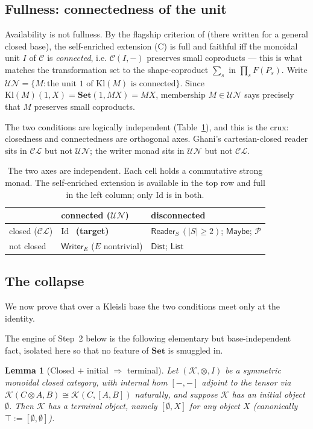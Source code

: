 \documentclass[11pt]{amsart}
\theoremstyle{plain}
\newtheorem{lemma}[theorem]{Lemma}
\theoremstyle{definition}
\theoremstyle{remark}
\newcommand{\Set}{\mathbf{Set}}
\newcommand{\Kl}{\mathrm{Kl}}
\newcommand{\Id}{\mathrm{Id}}
\newcommand{\Writer}{\mathsf{Writer}}
\newcommand{\Maybe}{\mathsf{Maybe}}
\newcommand{\Reader}{\mathsf{Reader}}
\newcommand{\Dist}{\mathsf{Dist}}
\newcommand{\List}{\mathsf{List}}
\newcommand{\PP}{\mathcal{P}}
\newcommand{\C}{\mathcal{C}}
\newcommand{\CL}{\mathcal{CL}}
\newcommand{\UN}{\mathcal{UN}}
\begin{document}
\subsection{Fullness: connectedness of the unit}\label{ssec:un}
Availability is not fullness. By the flagship criterion of \cite{MacBethBase} (there written for a
general closed base), the self-enriched extension (C) is full and faithful iff the monoidal unit $I$
of $\C$ is \emph{connected}, i.e. $\C(I,-)$ preserves small coproducts --- this is what matches the
transformation set to the shape-coproduct $\sum_s$ in $\prod_s F(P_s)$. Write
$\UN=\{M: \text{the unit }1\text{ of }\Kl(M)\text{ is connected}\}$. Since $\Kl(M)(1,X)=\Set(1,MX)=MX$,
membership $M\in\UN$ says precisely that $M$ preserves small coproducts.

The two conditions are logically independent (Table~\ref{tab:2x2}), and this is the crux: closedness
and connectedness are orthogonal axes. Ghani's cartesian-closed reader sits in $\CL$ but not $\UN$;
the writer monad sits in $\UN$ but not $\CL$.

\begin{table}[t]
\small
\begin{tabular}{@{}lll@{}}
\toprule
 & connected ($\UN$) & disconnected \\
\midrule
closed ($\CL$) & $\Id$ \ \textbf{(target)} & $\Reader_S\,(|S|\ge2)$; $\Maybe$; $\PP$ \\
not closed & $\Writer_E$ ($E$ nontrivial) & $\Dist$; $\List$ \\
\bottomrule
\end{tabular}
\medskip
\caption{The two axes are independent. Each cell holds a commutative strong monad. The self-enriched
extension is available in the top row and full in the left column; only $\Id$ is in both.}
\label{tab:2x2}
\end{table}

\subsection{The collapse}\label{ssec:collapse}
We now prove that over a Kleisli base the two conditions meet only at the identity.

The engine of Step~2 below is the following elementary but base-independent fact, isolated here so that
no feature of $\Set$ is smuggled in.

\begin{lemma}[Closed $+$ initial $\Rightarrow$ terminal]\label{lem:closed-initial-terminal}
Let $(\mathcal{K},\otimes,I)$ be a symmetric monoidal closed category, with internal hom $[-,-]$
adjoint to the tensor via $\mathcal{K}(C\otimes A,B)\cong\mathcal{K}(C,[A,B])$ naturally, and suppose
$\mathcal{K}$ has an initial object $\emptyset$. Then $\mathcal{K}$ has a terminal object, namely
$[\emptyset,X]$ for \emph{any} object $X$ (canonically $\top:=[\emptyset,\emptyset]$).
\end{lemma}
\end{document}
